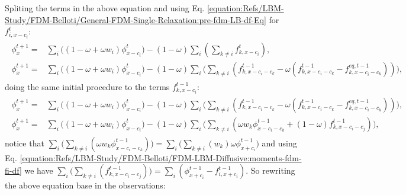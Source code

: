 \documentclass[letterpaper,10pt,english,openany,oneside]{jupyterBook}
\begin{document}
Spliting the terms in the above equation and using Eq. \eqref{equation:Refs/LBM-Study/FDM-Belloti/General-FDM-Single-Relaxation:pre-fdm-LB-df-Eq} for \(f_{i,x-c_{i}}^{t}\):
\begin{equation*}
\begin{split}
\begin{array}{ll}
\phi_{x}^{t+1} =& \displaystyle\sum_{i}\Big( (1-\omega + \omega w_{i}) \phi_{x-c_{i}}^{t}\Big) - (1-\omega)\displaystyle\sum_{i}\left( \displaystyle\sum_{k\neq i} f_{k,x-c_{i}}^{t} \right),\\
\phi_{x}^{t+1} =& \displaystyle\sum_{i}\Big( (1-\omega + \omega w_{i}) \phi_{x-c_{i}}^{t}\Big) - (1-\omega)\displaystyle\sum_{i}\Bigg( \displaystyle\sum_{k\neq i} \left( f_{k,x-c_{i}-c_{k}}^{t-1}  - \omega \left( f_{k,x-c_{i}-c_{k}}^{t-1} - f_{k,x-c_{i}-c_{k}}^{eq,t-1} \right) \right) \Bigg),
\end{array}
\end{split}
\end{equation*}
\sphinxAtStartPar
doing the same initial procedure to the terms \(f_{k,x-c_{i}}^{t-1}\):
\begin{equation*}
\begin{split}
\begin{array}{ll}
\phi_{x}^{t+1} = & \displaystyle\sum_{i}\Big( (1-\omega + \omega w_{i}) \phi_{x-c_{i}}^{t}\Big) -(1-\omega)\displaystyle\sum_{i}\Bigg( \displaystyle\sum_{k\neq i} \left( f_{k,x-c_{i}-c_{k}}^{t-1}  - \omega \left( f_{k,x-c_{i}-c_{k}}^{t-1} - f_{k,x-c_{i}-c_{k}}^{eq,t-1} \right) \right) \Bigg),\\
\phi_{x}^{t+1} = & \displaystyle\sum_{i}\Big( (1-\omega + \omega w_{i}) \phi_{x-c_{i}}^{t}\Big) - (1-\omega) \displaystyle\sum_{i}\Bigg( \displaystyle\sum_{k\neq i} \left( \omega w_{k} \phi_{x-c_{i}-c_{k}}^{t-1} + (1-\omega) f_{k,x-c_{i}-c_{j}}^{t-1} \right) \Bigg),
\end{array}
\end{split}
\end{equation*}
\sphinxAtStartPar
notice that \(\displaystyle\sum_{i}\Bigg( \displaystyle\sum_{k\neq i} \left( \omega w_{k} \phi_{x-c_{i}-c_{k}}^{t-1} \right) \Bigg)=\displaystyle\sum_{i}\Bigg( \displaystyle\sum_{k\neq i} \left(w_{k}\right) \omega \phi_{x+c_{i}}^{t-1}  \Bigg)\) and using Eq. \eqref{equation:Refs/LBM-Study/FDM-Belloti/FDM-LBM-Diffusive:moments-fdm-fi-df} we have \(\displaystyle\sum_{i}\Bigg( \displaystyle\sum_{k\neq i} \left( f_{k,x-c_{i}-c_{j}}^{t-1} \right) \Bigg)= \displaystyle\sum_{i}\left(\phi_{x+c_{i}}^{t-1} - f_{i,x+c_{i}}^{t-1}\right) \). So rewriting the above equation base in the observations:
\end{document}
